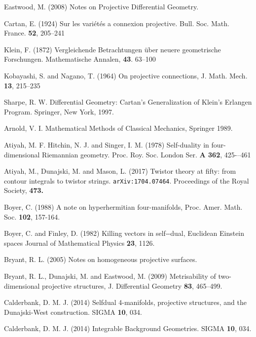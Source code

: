 
\begin{thebibliography}{}

 Eastwood, M. (2008)
Notes on Projective Differential Geometry.

 Cartan, E. (1924)
Sur les vari\'et\'es a connexion projective.
Bull. Soc. Math. France. {\bf 52}, 205--241

 Klein, F. (1872)
Vergleichende Betrachtungen \"uber neuere geometrische Forschungen. Mathematische Annalen, {\bf 43}. 63--100

 Kobayashi, S. and Nagano, T. (1964)
On projective connections, J. Math. Mech. {\bf 13}, 215--235

 Sharpe, R. W.
Differential Geometry: Cartan's Generalization of Klein's Erlangen Program. Springer, New York, 1997.

Arnold, V. I.
Mathematical Methods of Classical Mechanics, Springer 1989.

Atiyah, M. F.  Hitchin, N. J. and  
Singer, I. M. (1978) 
 Self-duality in four-dimensional Riemannian geometry. Proc. Roy. Soc. London Ser. {\bf A 362},  425-–461

Atiyah, M., Dunajski, M. and Mason, L. (2017) Twistor theory at fifty: from contour integrals to twistor strings. 
{\tt arXiv:1704.07464}. Proceedings of the Royal Society, {\bf 473.}


 Boyer, C. (1988) A note on hyperhermitian four-manifolds, Proc. Amer. Math. Soc. {\bf 102},
157-164.

 Boyer, C. and Finley, D. (1982)
Killing vectors in self‐-dual, Euclidean Einstein spaces
Journal of Mathematical Physics {\bf 23}, 1126.

  Bryant, R. L. (2005)
Notes on homogeneous projective surfaces.

 Bryant, R. L., Dunajski, M. and Eastwood, M.
 (2009)  Metrisability of two-dimensional projective structures,
J. Differential Geometry {\bf 83}, 465--499.


 Calderbank, D. M. J. (2014)
Selfdual 4-manifolds, projective structures, and the Dunajski-West construction. SIGMA {\bf 10}, 034.

 Calderbank, D. M. J. (2014)
Integrable Background Geometries. SIGMA {\bf 10}, 034.


\end{thebibliography}
